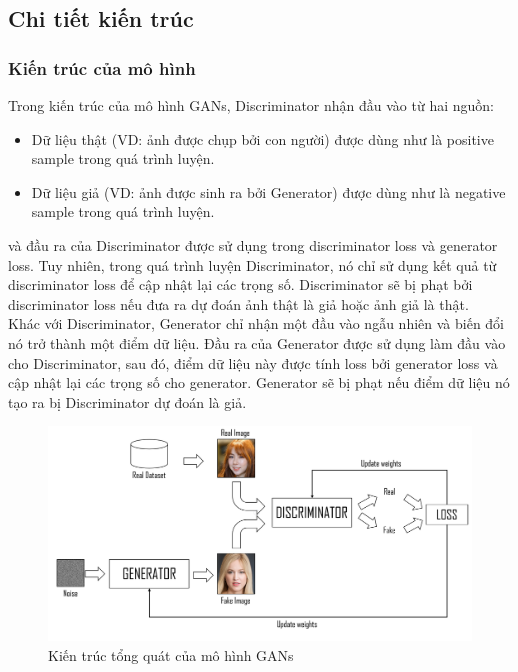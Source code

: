 {    \subsection{Chi tiết kiến trúc}
    \subsubsection{Kiến trúc của mô hình}
    \noindent Trong kiến trúc của mô hình GANs, Discriminator nhận đầu vào từ hai nguồn:

    \begin{itemize}[leftmargin=0cm,itemindent=.5cm,labelwidth=\itemindent,labelsep=0cm,align=left]
      \item Dữ liệu thật (VD: ảnh được chụp bởi con người) được dùng như là positive sample trong quá trình luyện.
      \item Dữ liệu giả (VD: ảnh được sinh ra bởi Generator) được dùng như là negative sample trong quá trình luyện.
    \end{itemize}
    
    \noindent và đầu ra của Discriminator được sử dụng trong discriminator loss và generator loss. Tuy nhiên, trong quá trình luyện Discriminator, nó chỉ sử dụng kết quả từ discriminator loss để cập nhật lại các trọng số. Discriminator sẽ bị phạt bởi discriminator loss nếu đưa ra dự đoán ảnh thật là giả hoặc ảnh giả là thật.\\
    Khác với Discriminator, Generator chỉ nhận một đầu vào ngẫu nhiên và biến đổi nó trở thành một điểm dữ liệu. Đầu ra của Generator được sử dụng làm đầu vào cho Discriminator, sau đó, điểm dữ liệu này được tính loss bởi generator loss và cập nhật lại các trọng số cho generator. Generator sẽ bị phạt nếu điểm dữ liệu nó tạo ra bị Discriminator dự đoán là giả.
    
    \begin{figure}[H]
    \centering
    \includegraphics[width=13cm] {images/gans_model.png}
    \caption{Kiến trúc tổng quát của mô hình GANs}
    \label{fig:gans_model}
    \end{figure}
    
}
